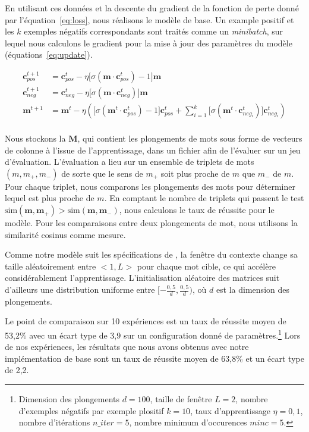 \documentclass[12pt]{article}
\begin{document}
En utilisant ces données et la descente du gradient de la fonction de perte donné par l'équation~\ref{eq:loss}, nous réalisons le modèle de base. Un example positif et les $k$ exemples négatifs correspondants sont traités comme un \textit{minibatch}, sur lequel nous calculons le gradient pour la mise à jour des paramètres du modèle (équations~\ref{eq:update}). 

\begin{equation}\label{eq:update}
\begin{split}
    \mathbf{c}_{pos}^{t+1} & = \mathbf{c}_{pos}^t - \eta \lbrack \sigma(\mathbf{m} \cdot \mathbf{c}_{pos}^t) - 1 \rbrack \mathbf{m} \\
    \mathbf{c}_{neg}^{t+1} & = \mathbf{c}_{neg}^t - \eta \lbrack \sigma(\mathbf{m} \cdot \mathbf{c}_{neg}^t)\rbrack \mathbf{m} \\
    \mathbf{m}^{t+1} & = \mathbf{m}^t - \eta (\lbrack \sigma(\mathbf{m}^t \cdot \mathbf{c}_{pos}^t) - 1\rbrack \mathbf{c}_{pos}^t + \sum_{i=1}^k \lbrack \sigma(\mathbf{m}^t \cdot \mathbf{c}_{neg_i}^t) \rbrack \mathbf{c}_{neg_i}^t) \\
\end{split}
\end{equation}

Nous stockons la $\mathbf{M}$, qui contient les plongements de mots sous forme de vecteurs de colonne à l'issue de l'apprentissage, dans un fichier afin de l'évaluer sur un jeu d'évaluation. L'évaluation a lieu sur un ensemble de triplets de mots $(m, m_+, m_-)$ de sorte que le sens de $m_+$ soit plus proche de $m$ que $m_-$ de $m$. Pour chaque triplet, nous comparons les plongements des mots pour déterminer lequel est plus proche de $m$. En comptant le nombre de triplets qui passent le test $ \text{sim}(\mathbf{m}, \mathbf{m}_+) > \text{sim}(\mathbf{m}, \mathbf{m}_-)$, nous calculons le taux de réussite pour le modèle. Pour les comparaisons entre deux plongements de mot, nous utilisons la similarité cosinus comme mesure. 

Comme notre modèle suit les spécifications de \cite{DBLP:journals/corr/abs-1301-3781}, la fenêtre du contexte change sa taille aléatoirement entre $<1, L>$ pour chaque mot cible, ce qui accélère considérablement l'apprentissage. L'initialisation aléatoire des matrices suit d'ailleurs une distribution uniforme entre $[-\frac{0{,}5}{d}, \frac{0{,}5}{d})$, où $d$ est la dimension des plongements.

Le point de comparaison sur 10 expériences est un taux de réussite moyen de 53{,}2\% avec un écart type de 3{,}9 sur un configuration donné de paramètres.\footnote{Dimension des plongements $d=100$, taille de fenêtre $L=2$, nombre d'exemples négatifs par exemple plositif $k=10$, taux d'apprentissage $\eta=0{,}1$, nombre d'itérations $n\_ iter=5$, nombre minimum d'occurences $minc=5$.} Lors de nos expériences, les résultats que nous avons obtenus avec notre implémentation de base sont un taux de réussite moyen de 63{,}8\% et un écart type de 2{,}2.
\end{document}

